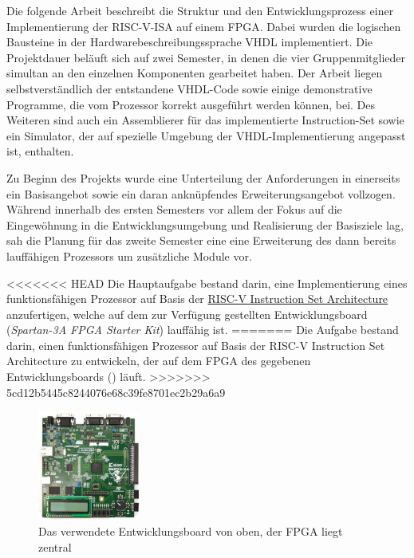 
Die folgende Arbeit beschreibt die Struktur und den Entwicklungsprozess einer Implementierung
der RISC-V-ISA auf einem FPGA. Dabei wurden die logischen Bausteine in der
Hardwarebeschreibungssprache VHDL implementiert. Die Projektdauer beläuft sich auf zwei Semester, in denen
die vier Gruppenmitglieder simultan an den einzelnen Komponenten gearbeitet haben. Der Arbeit liegen selbstverst\"andlich der entstandene VHDL-Code sowie einige demonstrative Programme, die vom Prozessor korrekt ausgef\"uhrt werden k\"onnen, bei. Des Weiteren sind auch ein Assemblierer f\"ur das implementierte Instruction-Set sowie ein Simulator, der auf spezielle Umgebung der VHDL-Implementierung angepasst ist, enthalten.

\newpage


Zu Beginn des Projekts wurde eine Unterteilung der Anforderungen in einerseits ein Basisangebot sowie ein daran ankn\"upfendes Erweiterungsangebot vollzogen. W\"ahrend innerhalb des ersten Semesters vor allem der Fokus auf die Eingew\"ohnung in die Entwicklungsumgebung und Realisierung der Basisziele lag, sah die Planung f\"ur das zweite Semester eine eine Erweiterung des dann bereits lauff\"ahigen Prozessors um zus\"atzliche Module vor. 


<<<<<<< HEAD
Die Hauptaufgabe bestand darin, eine Implementierung eines funktionsf\"ahigen Prozessor auf Basis der \href{https://riscv.org/specifications/}{RISC-V Instruction Set Architecture} anzufertigen, welche auf dem zur Verf\"ugung gestellten Entwicklungsboard (\textit{Spartan-3A FPGA Starter Kit}) lauff\"ahig ist.
=======
Die Aufgabe bestand darin, einen funktionsf\"ahigen Prozessor auf Basis der RISC-V Instruction Set Architecture zu entwickeln, der auf dem FPGA des gegebenen Entwicklungsboards () l\"auft.
>>>>>>> 5cd12b5445c8244076e68c39fe8701ec2b29a6a9
\begin{figure}[H]
	\centering
		\includegraphics[width=0.3\textwidth]{Board.png}
	\caption[Entwicklungsboard]{Das verwendete Entwicklungsboard von oben, der FPGA liegt zentral}
	\label{fig:board}
\end{figure}


